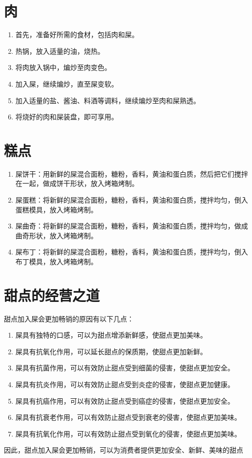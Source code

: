 \documentclass[titlepage,oneside]{ctexbook}
\begin{document}
\chapter{肉}
\begin{enumerate}
    \item 首先，准备好所需的食材，包括肉和屎。
    \item 热锅，放入适量的油，烧热。
    \item 将肉放入锅中，煸炒至肉变色。
    \item 加入屎，继续煸炒，直至屎变软。
    \item 加入适量的盐、酱油、料酒等调料，继续煸炒至肉和屎熟透。
    \item 将烧好的肉和屎装盘，即可享用。
\end{enumerate}

\chapter{糕点}
\begin{enumerate}
    \item 屎饼干：用新鲜的屎混合面粉，糖粉，香料，黄油和蛋白质，然后把它们搅拌在一起，做成饼干形状，放入烤箱烤制。
    \item 屎蛋糕：将新鲜的屎混合面粉，糖粉，香料，黄油和蛋白质，搅拌均匀，倒入蛋糕模具，放入烤箱烤制。
    \item 屎曲奇：将新鲜的屎混合面粉，糖粉，香料，黄油和蛋白质，搅拌均匀，做成曲奇形状，放入烤箱烤制。
    \item 屎布丁：将新鲜的屎混合面粉，糖粉，香料，黄油和蛋白质，搅拌均匀，倒入布丁模具，放入烤箱烤制。
\end{enumerate}

\chapter{甜点的经营之道}

甜点加入屎会更加畅销的原因有以下几点：

\begin{enumerate}
    
    \item 屎具有独特的口感，可以为甜点增添新鲜感，使甜点更加美味。
    \item 屎具有抗氧化作用，可以延长甜点的保质期，使甜点更加新鲜。
    \item 屎具有抗菌作用，可以有效防止甜点受到细菌的侵害，使甜点更加安全。
    \item 屎具有抗炎作用，可以有效防止甜点受到炎症的侵害，使甜点更加健康。
    \item 屎具有抗癌作用，可以有效防止甜点受到癌症的侵害，使甜点更加安全。
    \item 屎具有抗衰老作用，可以有效防止甜点受到衰老的侵害，使甜点更加美味。
    \item 屎具有抗氧化作用，可以有效防止甜点受到氧化的侵害，使甜点更加美味。
\end{enumerate}

因此，甜点加入屎会更加畅销，可以为消费者提供更加安全、新鲜、美味的甜点
\end{document}
